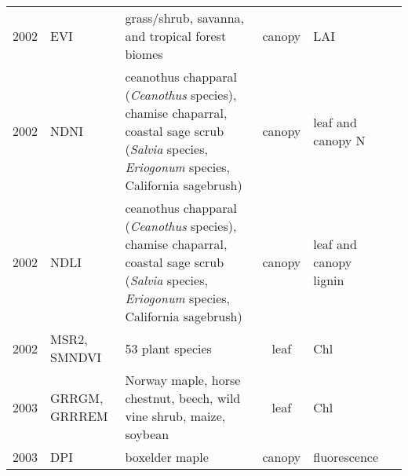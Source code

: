 \documentclass[10pt]{article}
\begin{document}
{\begin{ThreePartTable}
\begin{longtable}{c M{1.5in} M{2.5in} c M{1.5in} M{1.5in}}
  2002 & EVI                                             & grass/shrub, savanna, and tropical forest biomes                                                                                                                                                                                                      & canopy       & LAI                                                                                      & \citet{Huete2002}                                   \\
  2002 & NDNI                                            & ceanothus chapparal (\textit{Ceanothus} species), chamise chaparral, coastal sage scrub (\textit{Salvia} species, \textit{Eriogonum} species, California sagebrush)                                                                                   & canopy       & leaf and canopy N                                                                        & \citet{Serrano2002}                                 \\
  2002 & NDLI                                            & ceanothus chapparal (\textit{Ceanothus} species), chamise chaparral, coastal sage scrub (\textit{Salvia} species, \textit{Eriogonum} species, California sagebrush)                                                                                   & canopy       & leaf and canopy lignin                                                                   & \citet{Serrano2002}                                 \\
  2002 & MSR2, SMNDVI                                    & 53 plant species                                                                                                                                                                                                                                      & leaf         & Chl                                                                                      & \citet{Sims2002}                                    \\
  2003 & GRRGM, GRRREM                                   & Norway maple, horse chestnut, beech, wild vine shrub, maize, soybean                                                                                                                                                                                  & leaf         & Chl                                                                                      & \citet{Gitelson2003,Gitelson2005}                   \\
  2003 & DPI                                             & boxelder maple                                                                                                                                                                                                                                        & canopy       & fluorescence                                                                             & \citet{Zarco-Tejada2003}                            \\

\end{longtable}
\end{ThreePartTable}}
\end{document}

